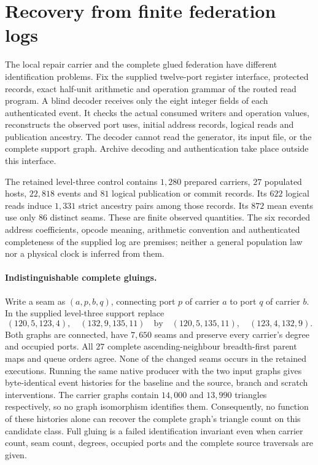 \section{Recovery from finite federation logs}
\label{app:federation-log-recovery}

The local repair carrier and the complete glued federation have different
identification problems. Fix the supplied twelve-port register interface,
protected records, exact half-unit arithmetic and operation grammar of the
routed read program. A blind decoder receives only the eight integer fields
of each authenticated event. It checks the actual consumed writers and
operation values, reconstructs the observed port uses, initial address
records, logical reads and publication ancestry. The decoder cannot read the
generator, its input file, or the complete support graph. Archive decoding
and authentication take place outside this interface.

The retained level-three control contains $1{,}280$ prepared carriers,
$27$ populated hosts, $22{,}818$ events and $81$ logical publication or commit
records. Its $622$ logical reads induce $1{,}331$ strict ancestry pairs among
those records. Its $872$ mean events use only $86$ distinct seams. These are
finite observed quantities. The six recorded address coefficients, opcode
meaning, arithmetic convention and authenticated completeness of the supplied
log are premises; neither a general population law nor a physical clock is
inferred from them.

\paragraph{Indistinguishable complete gluings.}
Write a seam as $(a,p,b,q)$, connecting port $p$ of carrier $a$ to port $q$
of carrier $b$. In the supplied level-three support replace
\[
 (120,5,123,4),\quad (132,9,135,11)
 \quad\text{by}\quad
 (120,5,135,11),\quad (123,4,132,9).
\]
Both graphs are connected, have $7{,}650$ seams and preserve every carrier's
degree and occupied ports. All $27$ complete ascending-neighbour
breadth-first parent maps and queue orders agree. None of the changed seams
occurs in the retained executions. Running the same native producer with the
two input graphs gives byte-identical event histories for the baseline and
the source, branch and scratch interventions. The carrier graphs contain
$14{,}000$ and $13{,}990$ triangles respectively, so no graph isomorphism
identifies them. Consequently, no function of these histories alone can
recover the complete graph's triangle count on this candidate class. Full
gluing is a failed identification invariant even when carrier count, seam
count, degrees, occupied ports and the complete source traversals are given.

